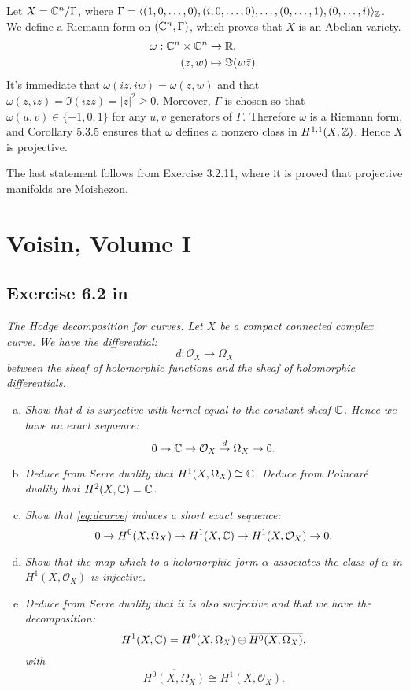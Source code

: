 \documentclass{article}
\begin{document}
Let $X = \mathbb{C}^n / \Gamma$, where $\Gamma = \langle (1, 0, \dots, 0), (i,0,\dots, 0), \dots, (0, \dots, 1), (0,\dots, i)
\rangle_{\mathbb{Z}}$. We define a Riemann form on $(\mathbb{C}^n, \Gamma)$, which proves that $X$ is an Abelian variety.
\begin{align*}
\omega : \mathbb{C}^n \times \mathbb{C}^n &\to \mathbb{R}, \\
(z,w) &\mapsto \Im(w\bar z).
\end{align*}
It's immediate that $\omega(iz, iw) = \omega(z,w)$ and that $\omega(z, iz) =\Im(i z \bar z) = |z|^2 \geq 0$. Moreover,
$\Gamma$ is chosen so that $\omega(u,v) \in \{-1, 0, 1\}$ for any $u,v$ generators of $\Gamma$. Therefore $\omega$
is a Riemann form, and Corollary 5.3.5 ensures that $\omega$ defines a nonzero class in $H^{1,1}(X,\mathbb{Z})$. Hence
$X$ is projective.

The last statement follows from Exercise 3.2.11, where it is proved that projective manifolds are Moishezon.



\section{Voisin, Volume I}
\subsection*{Exercise 6.2 in \cite{Voi1}}
\emph{The Hodge decomposition for curves. Let $X$ be a compact connected complex curve. We have the differential:}
\[	d : \mathcal{O}_X \to \Omega_X	\]
\emph{between the sheaf of holomorphic functions and the sheaf of holomorphic differentials.}
\begin{enumerate}[(a)]
\item \emph{Show that $d$ is surjective with kernel equal to the constant sheaf $\mathbb{C}$. Hence we have an exact
sequence:}
\begin{equation}
\label{eq:dcurve}
 0 \to \mathbb{C} \to \mathcal{O}_X \overset{d}{\to} \Omega_X \to 0 .
\end{equation}
\item \emph{Deduce from Serre duality that $H^1(X, \Omega_X) \cong \mathbb{C}$. Deduce from Poincar\'e duality that
$H^2(X, \mathbb{C}) = \mathbb{C}$.}
\item \emph{Show that \ref{eq:dcurve} induces a short exact sequence:}
\begin{equation}
\label{eq:hodgecurve}
0 \to H^0(X, \Omega_X) \to H^1(X, \mathbb{C}) \to H^1(X, \mathcal{O}_X) \to 0.
\end{equation}
\item \emph{Show that the map which to a holomorphic form $\alpha$ associates the class of $\bar \alpha$ in
$H^1(X, \mathcal{O}_X)$ is injective.}
\item \emph{Deduce from Serre duality that it is also surjective and that we have the decomposition:}
\begin{equation}
\label{eq:decompcurve}
H^1(X, \mathbb{C}) = H^0(X,\Omega_X) \oplus \overline{H^0(X,\Omega_X)},
\end{equation}
\emph{with}
\[	\overline{H^0(X,\Omega_X)} \cong H^1(X, \mathcal{O}_X).	\]
\end{enumerate}
\end{document}
